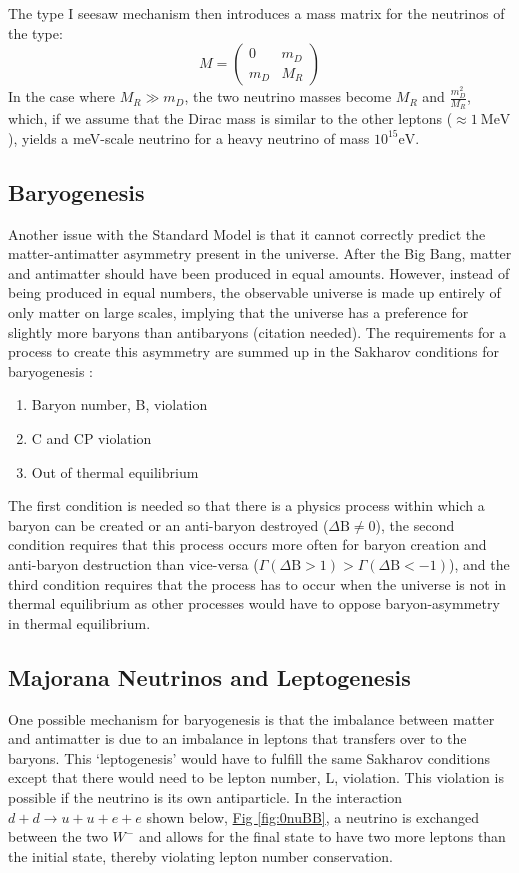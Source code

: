 \documentclass[12pt,a4paper]{article}
\begin{document}
The type I seesaw mechanism then introduces a mass matrix for the neutrinos of the type:
\begin{equation}
M =\begin{pmatrix}
0 & m_D \\
m_D & M_R
\end{pmatrix}
\end{equation}
In the case where $M_R \gg m_D$, the two neutrino masses become $M_R$ and $\frac{m_D^2}{M_R}$, which, if we assume that the Dirac mass is similar to the other leptons ($\approx 1~\textrm{MeV}$), yields a meV-scale neutrino for a heavy neutrino of mass $10^{15} \textrm{eV}$.

\subsection{Baryogenesis}

Another issue with the Standard Model is that it cannot correctly predict the matter-antimatter asymmetry present in the universe. After the Big Bang, matter and antimatter should have been produced in equal amounts. However, instead of being produced in equal numbers, the observable universe is made up entirely of only matter on large scales, implying that the universe has a preference for slightly more baryons than antibaryons (\color{blue}citation needed\color{black}). The requirements for a process to create this asymmetry are summed up in the Sakharov conditions for baryogenesis \cite{Sakharov:1967dj}:
\begin{enumerate}
\item Baryon number, B, violation
\item C and CP violation
\item Out of thermal equilibrium
\end{enumerate}
The first condition is needed so that there is a physics process within which a baryon can be created or an anti-baryon destroyed ($\Delta \textrm{B}\neq0$), the second condition requires that this process occurs more often for baryon creation and anti-baryon destruction than vice-versa ($\Gamma(\Delta \textrm{B}>1) > \Gamma(\Delta \textrm{B}<-1)$), and the third condition requires that the process has to occur when the universe is not in thermal equilibrium as other processes would have to oppose baryon-asymmetry in thermal equilibrium.

\subsection{Majorana Neutrinos and Leptogenesis}
One possible mechanism for baryogenesis is that the imbalance between matter and antimatter is due to an imbalance in leptons that transfers over to the baryons. This `leptogenesis' would have to fulfill the same Sakharov conditions except that there would need to be lepton number, L, violation. This violation is possible if the neutrino is its own antiparticle. In the interaction $d + d \rightarrow u + u + e + e$ shown below,  \hyperref[fig:0nuBB]{Fig \ref*{fig:0nuBB}}, a neutrino is exchanged between the two $W^-$ and allows for the final state to have two more leptons than the initial state, thereby violating lepton number conservation.
\end{document}
